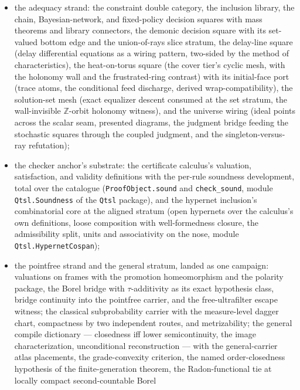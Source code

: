 \begin{itemize}
  certificates on the compositor, and the two fences (non-surjective
  ideal-point transport; presentation-sensitivity of the
  compositor);
\item the adequacy strand: the constraint double category, the
  inclusion library, the chain, Bayesian-network, and fixed-policy
  decision squares with mass theorems and library connectors, the
  demonic decision square with its set-valued bottom edge and
  the union-of-rays slice stratum, the delay-line square (delay
  differential equations as a wiring pattern, two-sided by the
  method of characteristics), the heat-on-torus square (the
  cover tier's cyclic mesh, with the holonomy wall and the
  frustrated-ring contrast) with its initial-face port (trace atoms,
  the conditional feed discharge, derived wrap-compatibility), the
  solution-set mesh (exact equalizer descent consumed at the set
  stratum, the wall-invisible $\mathbb{Z}$-orbit holonomy witness),
  and the universe wiring (ideal points
  across the scalar seam, presented diagrams, the judgment bridge
  feeding the stochastic squares through the coupled judgment, and
  the singleton-versus-ray refutation);
\item the checker anchor's substrate: the certificate calculus's
  valuation, satisfaction, and validity definitions with the
  per-rule soundness development, total over the catalogue
  (\texttt{ProofObject.sound} and \texttt{check\_sound}, module
  \texttt{Qtsl.Soundness} of the \texttt{Qtsl} package), and the
  hypernet inclusion's combinatorial core at the aligned stratum
  (open hypernets over the calculus's own definitions, loose
  composition with well-formedness closure, the admissibility
  split, units and associativity on the nose, module
  \texttt{Qtsl.HypernetCospan});
\item the pointfree strand and the general stratum, landed as one
  campaign: valuations on frames with the promotion homeomorphism
  and the polarity package, the Borel bridge with
  $\tau$-additivity as its exact hypothesis class, bridge
  continuity into the pointfree carrier, and the free-ultrafilter
  escape witness; the classical subprobability carrier with the
  measure-level dagger chart, compactness by two independent
  routes, and metrizability; the general compile dictionary ---
  closedness iff lower semicontinuity, the image characterization,
  unconditional reconstruction --- with the general-carrier atlas
  placements, the grade-convexity criterion, the named
  order-closedness hypothesis of the finite-generation theorem, the
  Radon-functional tie at locally compact second-countable Borel

\end{itemize}
